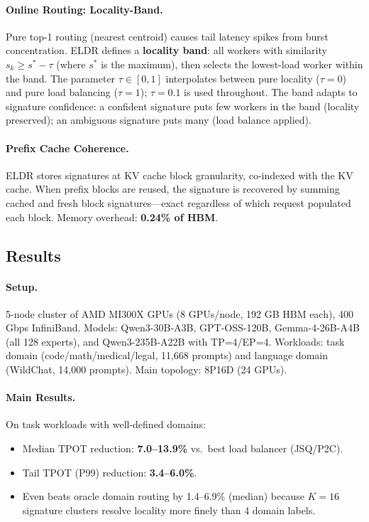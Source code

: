 \documentclass[11pt,a4paper]{article}
\begin{document}
\paragraph{Online Routing: Locality-Band.} Pure top-1 routing (nearest centroid) causes tail latency spikes from burst concentration. ELDR defines a \textbf{locality band}: all workers with similarity $s_k \geq s^* - \tau$ (where $s^*$ is the maximum), then selects the lowest-load worker within the band. The parameter $\tau \in [0,1]$ interpolates between pure locality ($\tau = 0$) and pure load balancing ($\tau = 1$); $\tau = 0.1$ is used throughout. The band adapts to signature confidence: a confident signature puts few workers in the band (locality preserved); an ambiguous signature puts many (load balance applied).

\paragraph{Prefix Cache Coherence.} ELDR stores signatures at KV cache block granularity, co-indexed with the KV cache. When prefix blocks are reused, the signature is recovered by summing cached and fresh block signatures---exact regardless of which request populated each block. Memory overhead: \textbf{0.24\% of HBM}.

\subsection{Results}

\paragraph{Setup.} 5-node cluster of AMD MI300X GPUs (8 GPUs/node, 192 GB HBM each), 400 Gbps InfiniBand. Models: Qwen3-30B-A3B, GPT-OSS-120B, Gemma-4-26B-A4B (all 128 experts), and Qwen3-235B-A22B with TP=4/EP=4. Workloads: task domain (code/math/medical/legal, 11,668 prompts) and language domain (WildChat, 14,000 prompts). Main topology: 8P16D (24 GPUs).

\paragraph{Main Results.} On task workloads with well-defined domains:
\begin{itemize}
\item Median TPOT reduction: \textbf{7.0--13.9\%} vs.\ best load balancer (JSQ/P2C).
\item Tail TPOT (P99) reduction: \textbf{3.4--6.0\%}.
\item Even beats oracle domain routing by 1.4--6.9\% (median) because $K = 16$ signature clusters resolve locality more finely than 4 domain labels.
\end{itemize}
\end{document}
